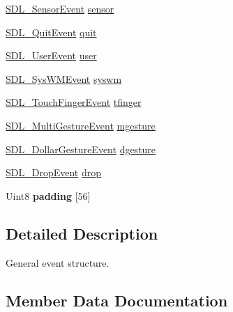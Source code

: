 \begin{DoxyCompactItemize}
\item 
\mbox{\hyperlink{struct_s_d_l___sensor_event}{S\+D\+L\+\_\+\+Sensor\+Event}} \mbox{\hyperlink{union_s_d_l___event_af0da8e4a59228360984595125062eb2f}{sensor}}
\item 
\mbox{\hyperlink{struct_s_d_l___quit_event}{S\+D\+L\+\_\+\+Quit\+Event}} \mbox{\hyperlink{union_s_d_l___event_a102a3008afe67a1c02ae7504e232dcef}{quit}}
\item 
\mbox{\hyperlink{struct_s_d_l___user_event}{S\+D\+L\+\_\+\+User\+Event}} \mbox{\hyperlink{union_s_d_l___event_ab7c394e3ce7bf1e4f8d68bc0e9f1b042}{user}}
\item 
\mbox{\hyperlink{struct_s_d_l___sys_w_m_event}{S\+D\+L\+\_\+\+Sys\+W\+M\+Event}} \mbox{\hyperlink{union_s_d_l___event_ab3b2eaf5348d4c50a51b1f297fdef537}{syswm}}
\item 
\mbox{\hyperlink{struct_s_d_l___touch_finger_event}{S\+D\+L\+\_\+\+Touch\+Finger\+Event}} \mbox{\hyperlink{union_s_d_l___event_ab18d7d60794cb056948ffa58541bc3c5}{tfinger}}
\item 
\mbox{\hyperlink{struct_s_d_l___multi_gesture_event}{S\+D\+L\+\_\+\+Multi\+Gesture\+Event}} \mbox{\hyperlink{union_s_d_l___event_ac19b3c6a6b5181a51eb4fbe2cbe726a9}{mgesture}}
\item 
\mbox{\hyperlink{struct_s_d_l___dollar_gesture_event}{S\+D\+L\+\_\+\+Dollar\+Gesture\+Event}} \mbox{\hyperlink{union_s_d_l___event_a4481167b9f8549aeb254e97ca812e74d}{dgesture}}
\item 
\mbox{\hyperlink{struct_s_d_l___drop_event}{S\+D\+L\+\_\+\+Drop\+Event}} \mbox{\hyperlink{union_s_d_l___event_acff77bccbca65abbb876360a3f5209c9}{drop}}
\item 
\mbox{\label{union_s_d_l___event_aabb599570edfa54aad6255c1f24f2ad2}} 
Uint8 {\bfseries padding} \mbox{[}56\mbox{]}
\end{DoxyCompactItemize}


\subsection{Detailed Description}
General event structure. 

\subsection{Member Data Documentation}
\mbox{\label{union_s_d_l___event_a111e01fcac4fd8e251a6058ff9f17e72}} 
